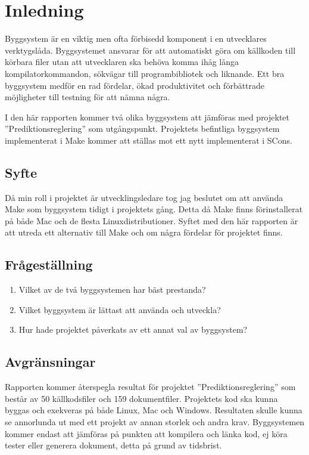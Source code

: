 \section{Inledning}
Byggsystem är en viktig men ofta förbisedd komponent i en utvecklares verktygslåda. Byggsystemet ansvarar för att automatiskt göra om källkoden till körbara filer utan att utvecklaren ska behöva komma ihåg långa kompilatorkommandon, sökvägar till programbibliotek och liknande. Ett bra byggsystem medför en rad fördelar, ökad produktivitet och förbättrade möjligheter till testning för att nämna några.

I den här rapporten kommer två olika byggsystem att jämföras med projektet ''Prediktionsreglering'' som utgångspunkt. Projektets befintliga byggsystem implementerat i Make kommer att ställas mot ett nytt implementerat i SCons. 

\subsection{Syfte}
Då min roll i projektet är utvecklingsledare tog jag beslutet om att använda Make som byggsystem tidigt i projektets gång. Detta då Make finns förinstallerat på både Mac och de flesta Linuxdistributioner. Syftet med den här rapporten är att utreda ett alternativ till Make och om några fördelar för projektet finns.

\subsection{Frågeställning} \label{avsnitt:fragestallning}

\begin{enumerate}
\item Vilket av de två byggsystemen har bäst prestanda?
\item Vilket byggsystem är lättast att använda och utveckla?
\item Hur hade projektet påverkats av ett annat val av byggsystem?
\end{enumerate}

\subsection{Avgränsningar} \label{avsnitt:avgransningar}
Rapporten kommer återspegla resultat för projektet ''Prediktionsreglering'' som består av 50 källkodsfiler och 159 dokumentfiler. Projektets kod ska kunna byggas och exekveras på både Linux, Mac och Windows. Resultaten skulle kunna se annorlunda ut med ett projekt av annan storlek och andra krav. Byggsystemen kommer endast att jämföras på punkten att kompilera och länka kod, ej köra tester eller generera dokument, detta på grund av tidsbrist.
